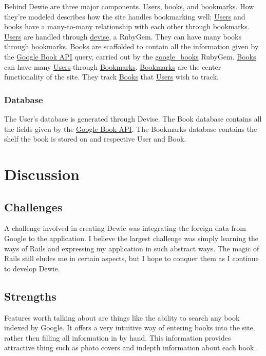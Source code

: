 \documentclass[11pt]{article}
\begin{document}
   Behind Dewie are three major components.  \underline{Users}, \underline{books}, and \underline{bookmarks}.  How they're modeled describes how the site handles bookmarking well:  \underline{Users} and \underline{books} have a many-to-many relationship with each other through \underline{bookmarks}.
   \underline{Users} are handled through \href{https://github.com/plataformatec/devise}{devise}, a RubyGem.  They can have many books through \underline{bookmarks}.
   \underline{Books} are scaffolded to contain all the information given by the \href{http://code.google.com/apis/books/}{Google Book API} query, carried out by the \href{http://rubygems.org/gems/google_books}{google\_books} RubyGem.  \underline{Books} can have many \underline{Users} through \underline{Bookmarks}.
   \underline{Bookmarks} are the center functionality of the site.  They track \underline{Books} that \underline{Users} wish to track. 
\subsubsection{Database}
\label{sec-4-2-1}

    The User's database is generated through Devise.  The Book database contains all the fields given by the \href{http://code.google.com/apis/books/}{Google Book API}.  The Bookmarks database contains the shelf the book is stored on and respective User and Book.
\section{Discussion}
\label{sec-5}
\subsection{Challenges}
\label{sec-5-1}

   A challenge involved in creating Dewie was integrating the foreign data from Google to the application.  I believe the largest challenge was simply learning the ways of Rails and expressing my application in such abstract ways.  The magic of Rails still eludes me in certain aspects, but I hope to conquer them as I continue to develop Dewie.
\subsection{Strengths}
\label{sec-5-2}

   Features worth talking about are things like the ability to search any book indexed by Google.  It offers a very intuitive way of entering books into the site, rather then filling all information in by hand.  This information provides attractive thing such as photo covers and indepth information about each book.
\end{document}
